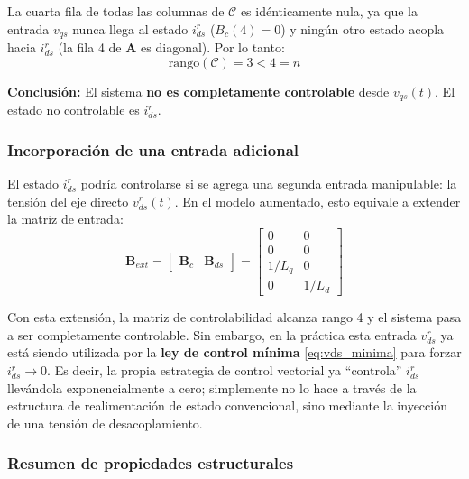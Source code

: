 \documentclass[12pt, a4paper,journal, onecolumn, compsoc]{IEEEtran}
\begin{document}
La cuarta fila de todas las columnas de $\mathcal{C}$ es idénticamente nula, ya que la entrada $v_{qs}$ nunca llega al estado $i_{ds}^r$ ($B_c(4) = 0$) y ningún otro estado acopla hacia $i_{ds}^r$ (la fila 4 de $\mathbf{A}$ es diagonal). Por lo tanto:
\begin{equation}
    \text{rango}(\mathcal{C}) = 3 < 4 = n
\end{equation}

\textbf{Conclusión:} El sistema \textbf{no es completamente controlable} desde $v_{qs}(t)$. El estado no controlable es $i_{ds}^r$.

\subsubsection{Incorporación de una entrada adicional}
El estado $i_{ds}^r$ podría controlarse si se agrega una segunda entrada manipulable: la tensión del eje directo $v_{ds}^r(t)$. En el modelo aumentado, esto equivale a extender la matriz de entrada:
\begin{equation}
    \mathbf{B}_{ext} = \begin{bmatrix} \mathbf{B}_c & \mathbf{B}_{ds} \end{bmatrix} =
    \begin{bmatrix}
    0 & 0 \\ 0 & 0 \\ 1/L_q & 0 \\ 0 & 1/L_d
    \end{bmatrix}
\end{equation}

Con esta extensión, la matriz de controlabilidad alcanza rango 4 y el sistema pasa a ser completamente controlable. Sin embargo, en la práctica esta entrada $v_{ds}^r$ ya está siendo utilizada por la \textbf{ley de control mínima} \eqref{eq:vds_minima} para forzar $i_{ds}^r \to 0$. Es decir, la propia estrategia de control vectorial ya ``controla'' $i_{ds}^r$ llevándola exponencialmente a cero; simplemente no lo hace a través de la estructura de realimentación de estado convencional, sino mediante la inyección de una tensión de desacoplamiento.

\subsubsection{Resumen de propiedades estructurales}
\end{document}
